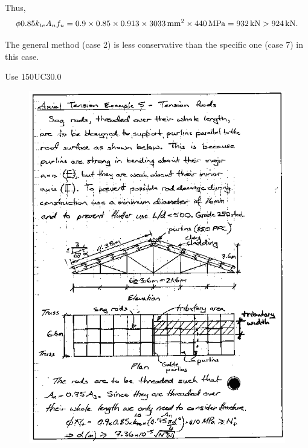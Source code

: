 \begin{solution}
Thus,
\begin{gather*}
\phi0.85k_{te}A_nf_u=0.9\times0.85\times0.913\times\SI{3033}{\milli\meter^2}\times\SI{440}{\mega\pascal}=\SI{932}{\kilo\newton}>\SI{924}{\kilo\newton}.
\end{gather*}

The general method (case 2) is less conservative than the specific one (case 7) in this case.
\begin{flushright}
Use 150UC30.0
\end{flushright}
\begin{figure}[H]
\centering

\end{figure}
\end{solution}

\begin{figure}[p]
\centering\includegraphics[width=.99\textwidth]{PIC/CH03/TR1}
\end{figure}
